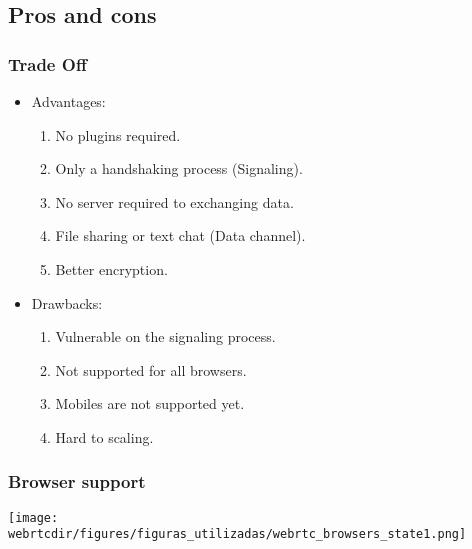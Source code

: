 \subsection{Pros and cons}
\begin{frame}[fragile]\frametitle{Trade Off}
\begin{itemize}
\item Advantages:
  \begin{enumerate}
  \item No plugins required. %
  \item Only a handshaking process (Signaling). %
  \item No server required to exchanging data.
  \item File sharing or text chat (Data channel).
  \item Better encryption.%
  \end{enumerate}

\item Drawbacks:
  \begin{enumerate}
  \item Vulnerable on the signaling process.%
  \item Not supported for all browsers. %
  \item Mobiles are not supported yet. %
  \item Hard to scaling. %
  \end{enumerate}
\end{itemize}
\end{frame}
\clearpage

\begin{frame}[fragile]\frametitle{Browser support}

\texttt{[image: \\webrtcdir/figures/figuras\_utilizadas/webrtc\_browsers\_state1.png]}

\end{frame}

